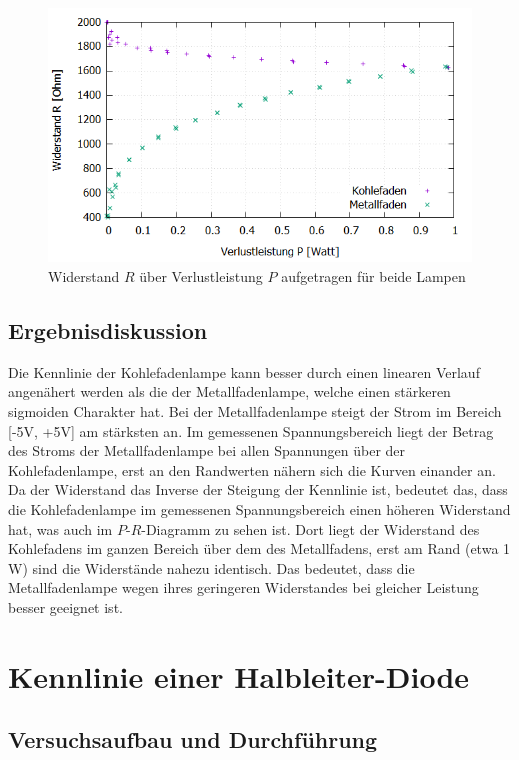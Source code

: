 \documentclass{scrartcl}
\begin{document}
\begin{figure}[H]
  \centering
    \includegraphics[scale=0.5]{V1_Leistung-Widerstand.PNG}
  \caption{Widerstand $R$ über Verlustleistung $P$ aufgetragen für beide Lampen}
  \label{fig:V1_Leistung-Widerstand}
\end{figure}
\subsection{Ergebnisdiskussion}
Die Kennlinie der Kohlefadenlampe kann besser durch einen linearen Verlauf angenähert werden als die der Metallfadenlampe, welche einen stärkeren sigmoiden Charakter hat. Bei der Metallfadenlampe steigt der Strom im Bereich [-5V, +5V] am stärksten an. Im gemessenen Spannungsbereich liegt der Betrag des Stroms der Metallfadenlampe bei allen Spannungen über der Kohlefadenlampe, erst an den Randwerten nähern sich die Kurven einander an. Da der Widerstand das Inverse der Steigung der Kennlinie ist, bedeutet das, dass die Kohlefadenlampe im gemessenen Spannungsbereich einen höheren Widerstand hat, was auch im $P$-$R$-Diagramm zu sehen ist. Dort liegt der Widerstand des Kohlefadens im ganzen Bereich über dem des Metallfadens, erst am Rand (etwa 1 W) sind die Widerstände nahezu identisch. Das bedeutet, dass die Metallfadenlampe wegen ihres geringeren Widerstandes bei gleicher Leistung besser geeignet ist.



\pagebreak
\section{Kennlinie einer Halbleiter-Diode}
\subsection{Versuchsaufbau und Durchführung}
\end{document}
